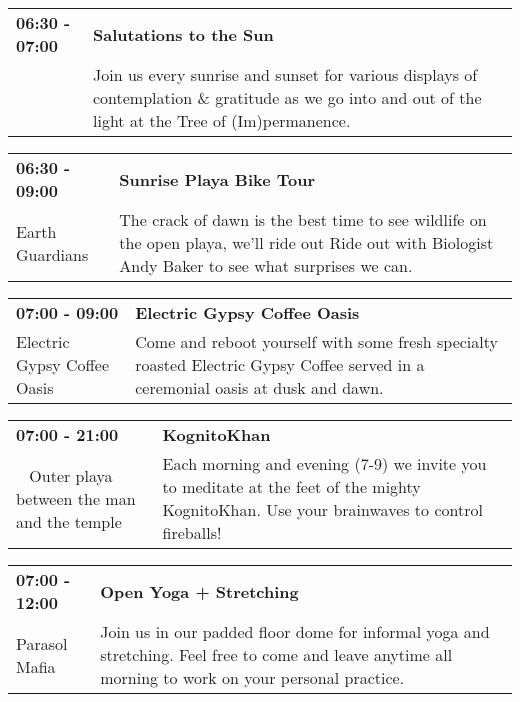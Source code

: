 \begin{tabular}{ p{1in} p{2.2in} }
    \textbf{06:30 - 07:00} & \textbf{Salutations to the Sun} \\
    ~ \newline  & Join us every sunrise and sunset for various displays of contemplation \& gratitude as we go into and out of the light at the Tree of (Im)permanence. \\
    \hline 
\end{tabular}
    
\begin{tabular}{ p{1in} p{2.2in} }
    \textbf{06:30 - 09:00} & \textbf{Sunrise Playa Bike Tour} \\
    Earth Guardians \newline  & The crack of dawn is the best time to see wildlife on the open playa, we'll ride out Ride out with Biologist Andy Baker to see what surprises we can. \\
    \hline 
\end{tabular}
    
\begin{tabular}{ p{1in} p{2.2in} }
    \textbf{07:00 - 09:00} & \textbf{Electric Gypsy Coffee Oasis} \\
    Electric Gypsy Coffee Oasis \newline  & Come and reboot yourself with some fresh specialty roasted Electric Gypsy Coffee served in a ceremonial oasis at dusk and dawn. \\
    \hline 
\end{tabular}
    
\begin{tabular}{ p{1in} p{2.2in} }
    \textbf{07:00 - 21:00} & \textbf{KognitoKhan} \\
    ~ \newline Outer playa between the man and the temple & Each morning and evening (7-9) we invite you to meditate at the feet of the mighty KognitoKhan. Use your brainwaves to control fireballs! \\
    \hline 
\end{tabular}
    
\begin{tabular}{ p{1in} p{2.2in} }
    \textbf{07:00 - 12:00} & \textbf{Open Yoga + Stretching} \\
    Parasol Mafia \newline  & Join us in our padded floor dome for informal yoga and stretching. Feel free to come and leave anytime all morning to work on your personal practice. \\
    \hline 
\end{tabular}
    
